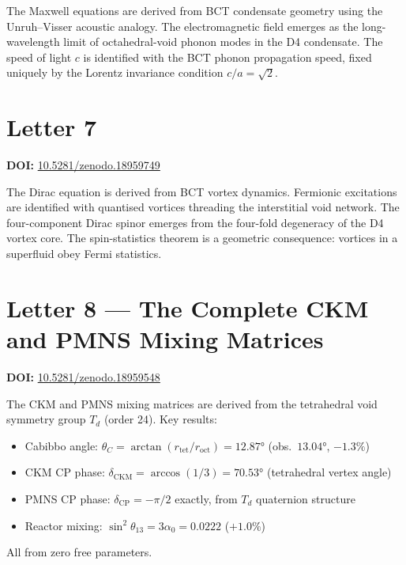 \documentclass[aps,prl,twocolumn,showpacs,preprintnumbers]{revtex4-2}
\newcommand{\roct}{r_{\mathrm{oct}}}
\newcommand{\rtet}{r_{\mathrm{tet}}}
\begin{document}
\medskip
The Maxwell equations are derived from BCT condensate geometry
using the Unruh--Visser acoustic analogy. The electromagnetic
field emerges as the long-wavelength limit of octahedral-void
phonon modes in the D4 condensate. The speed of light $c$ is
identified with the BCT phonon propagation speed, fixed uniquely
by the Lorentz invariance condition $c/a = \sqrt{2}$.

\section{Letter 7}
\noindent\textbf{DOI:} \href{https://doi.org/10.5281/zenodo.18959749}{10.5281/zenodo.18959749}

\medskip
The Dirac equation is derived from BCT vortex dynamics. Fermionic
excitations are identified with quantised vortices threading the
interstitial void network. The four-component Dirac spinor emerges
from the four-fold degeneracy of the D4 vortex core. The spin-statistics
theorem is a geometric consequence: vortices in a superfluid obey
Fermi statistics.

\section{Letter 8 --- The Complete CKM and PMNS Mixing Matrices}
\noindent\textbf{DOI:} \href{https://doi.org/10.5281/zenodo.18959548}{10.5281/zenodo.18959548}

\medskip
The CKM and PMNS mixing matrices are derived from the tetrahedral
void symmetry group $T_d$ (order 24). Key results:
\begin{itemize}
  \item Cabibbo angle: $\theta_C = \arctan(\rtet/\roct) = 12.87°$ (obs.\ $13.04°$, $-1.3\%$)
  \item CKM CP phase: $\delta_{\mathrm{CKM}} = \arccos(1/3) = 70.53°$ (tetrahedral vertex angle)
  \item PMNS CP phase: $\delta_{\mathrm{CP}} = -\pi/2$ exactly, from $T_d$ quaternion structure
  \item Reactor mixing: $\sin^2\theta_{13} = 3\alpha_0 = 0.0222$ ($+1.0\%$)
\end{itemize}
All from zero free parameters.
\end{document}
